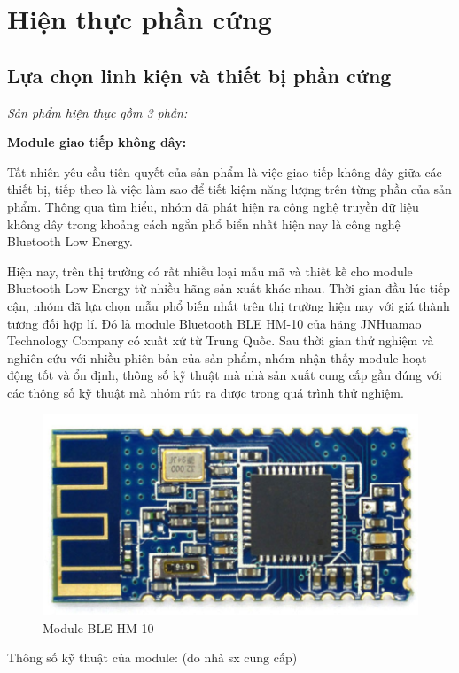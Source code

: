 \section{Hiện thực phần cứng}
\subsection{Lựa chọn linh kiện và thiết bị phần cứng}

\textit{Sản phẩm hiện thực gồm 3 phần:}

\textbf{Module giao tiếp không dây:}

Tất nhiên yêu cầu tiên quyết của sản phẩm là việc giao tiếp không dây giữa các thiết bị, tiếp theo là việc làm sao để tiết kiệm năng lượng trên từng phần của sản phẩm. Thông qua tìm hiểu, nhóm đã phát hiện ra công nghệ truyền dữ liệu không dây trong khoảng cách ngắn phổ biển nhất hiện nay là công nghệ Bluetooth Low Energy. 

Hiện nay, trên thị trường có rất nhiều loại mẫu mã và thiết kế cho module Bluetooth Low Energy từ nhiều hãng sản xuất khác nhau. Thời gian đầu lúc tiếp cận, nhóm đã lựa chọn mẫu phổ biến nhất trên thị trường hiện nay với giá thành tương đối hợp lí. Đó là module Bluetooth BLE HM-10 của hãng JNHuamao Technology Company có xuất xứ từ Trung Quốc. Sau thời gian thử nghiệm và nghiên cứu với nhiều phiên bản của sản phẩm, nhóm nhận thấy module hoạt động tốt và ổn định, thông số kỹ thuật mà nhà sản xuất cung cấp gần đúng với các thông số kỹ thuật mà nhóm rút ra được trong quá trình thử nghiệm.

\begin{figure}[h]
	\centering    
	\includegraphics[width=1.0\textwidth]{hm10}
	\caption[Module BLE HM-10]{Module BLE HM-10}
	\label{fig: c2-hm10}
\end{figure}

Thông số kỹ thuật của module: (do nhà sx cung cấp)


